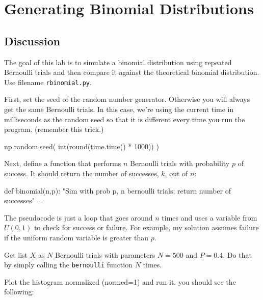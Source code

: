\chapter{Generating Binomial Distributions}

\setcounter{problem}{1}
\section{Discussion}

\begin{fullwidth}

The goal of this lab is to simulate a binomial distribution using repeated Bernoulli trials and then compare it against the theoretical binomial distribution. Use filename {\tt rbinomial.py}.

\step First, set the seed of the random number generator. Otherwise you will always get the same  Bernoulli trials. In this case, we're using the current time in milliseconds as the random seed so that it is different every time you run the program. (remember this trick.)

\begin{pyverbatim}
np.random.seed( int(round(time.time() * 1000)) )
\end{pyverbatim}

\step Next, define a function that performs $n$ Bernoulli trials with probability $p$ of success. It should return the number of successes, $k$, out of $n$:

\begin{pyverbatim}
def binomial(n,p):
    "Sim with prob p, n bernoulli trials; return number of successes"
    ...
\end{pyverbatim}

The pseudocode is just a loop that goes around $n$ times and uses a variable from $U(0,1)$ to check for success or failure. For example, my solution assumes failure if the uniform random variable is greater than $p$.
    
\step Get list $X$ as $N$ Bernoulli trials with parameters $N=500$ and $P=0.4$. Do that by simply calling the {\tt bernoulli} function $N$ times.

\step Plot the histogram normalized (normed=1) and run it. you should see the following:


\end{fullwidth}
